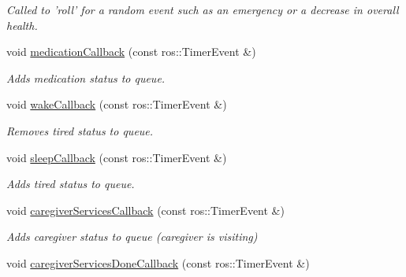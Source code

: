 \begin{DoxyCompactItemize}
\begin{DoxyCompactList}\small\item\em Called to 'roll' for a random event such as an emergency or a decrease in overall health. \end{DoxyCompactList}\item 
\hypertarget{classResident_a385c83c3916a4d27d2a25ef8b370bec9}{void \hyperlink{classResident_a385c83c3916a4d27d2a25ef8b370bec9}{medication\-Callback} (const ros\-::\-Timer\-Event \&)}\label{classResident_a385c83c3916a4d27d2a25ef8b370bec9}

\begin{DoxyCompactList}\small\item\em Adds medication status to queue. \end{DoxyCompactList}\item 
\hypertarget{classResident_a077344652ee8d61fb8af7b79f6694514}{void \hyperlink{classResident_a077344652ee8d61fb8af7b79f6694514}{wake\-Callback} (const ros\-::\-Timer\-Event \&)}\label{classResident_a077344652ee8d61fb8af7b79f6694514}

\begin{DoxyCompactList}\small\item\em Removes tired status to queue. \end{DoxyCompactList}\item 
\hypertarget{classResident_ac66d104fcc8722a2d5888171eecfbd69}{void \hyperlink{classResident_ac66d104fcc8722a2d5888171eecfbd69}{sleep\-Callback} (const ros\-::\-Timer\-Event \&)}\label{classResident_ac66d104fcc8722a2d5888171eecfbd69}

\begin{DoxyCompactList}\small\item\em Adds tired status to queue. \end{DoxyCompactList}\item 
\hypertarget{classResident_ac83ee402243f607d6026b9f2796f8ef1}{void \hyperlink{classResident_ac83ee402243f607d6026b9f2796f8ef1}{caregiver\-Services\-Callback} (const ros\-::\-Timer\-Event \&)}\label{classResident_ac83ee402243f607d6026b9f2796f8ef1}

\begin{DoxyCompactList}\small\item\em Adds caregiver status to queue (caregiver is visiting) \end{DoxyCompactList}\item 
\hypertarget{classResident_a230654cb391de275302021decf9baa53}{void \hyperlink{classResident_a230654cb391de275302021decf9baa53}{caregiver\-Services\-Done\-Callback} (const ros\-::\-Timer\-Event \&)}\label{classResident_a230654cb391de275302021decf9baa53}


\end{DoxyCompactItemize}
